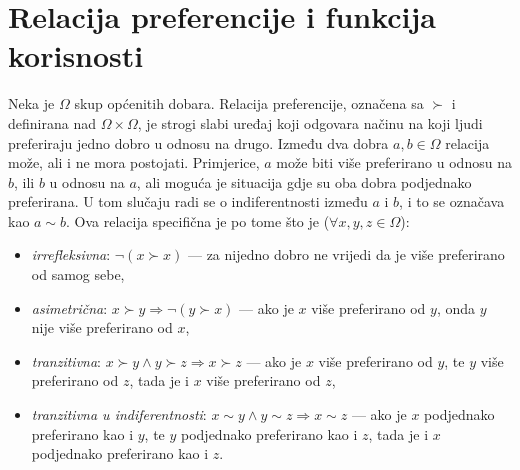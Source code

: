 \documentclass[lmodern, utf8, diplomski]{fer}
\begin{document}
  \section{Relacija preferencije i funkcija korisnosti}

  Neka je $\Omega$ skup općenitih dobara.
  Relacija preferencije, označena sa $\succ$ i definirana nad $\Omega \times \Omega$, je strogi slabi uređaj koji odgovara načinu na koji ljudi preferiraju jedno dobro u odnosu na drugo.
  Između dva dobra $a, b \in \Omega$ relacija može, ali i ne mora postojati.
  Primjerice, $a$ može biti više preferirano u odnosu na $b$, ili $b$ u odnosu na $a$, ali moguća je situacija gdje su oba dobra podjednako preferirana.
  U tom slučaju radi se o indiferentnosti između $a$ i $b$, i to se označava kao $a \sim b$.
  Ova relacija specifična je po tome što je ($\forall x, y, z \in \Omega$):
  \begin{itemize}
    \item \textit{irrefleksivna}: $\neg \left( x \succ x \right)$ --- za nijedno dobro ne vrijedi da je više preferirano od samog sebe,
    \item \textit{asimetrična}: $x \succ y \Rightarrow \neg \left( y \succ x \right)$ --- ako je $x$ više preferirano od $y$, onda $y$ nije više preferirano od $x$,
    \item \textit{tranzitivna}: $x \succ y \wedge y \succ z \Rightarrow x \succ z$ --- ako je $x$ više preferirano od $y$, te $y$ više preferirano od $z$, tada je i $x$ više preferirano od $z$,
    \item \textit{tranzitivna u indiferentnosti}: $x \sim y \wedge y \sim z \Rightarrow x \sim z$ --- ako je $x$ podjednako preferirano kao i $y$, te $y$ podjednako preferirano kao i $z$, tada je i $x$ podjednako preferirano kao i $z$.
  \end{itemize}
  
\end{document}
